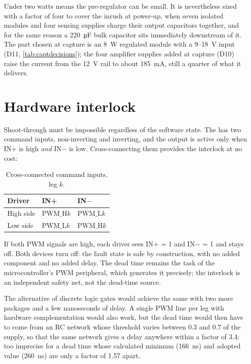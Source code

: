 Under two watts means the pre-regulator can be small. It is nevertheless
sized with a factor of four to cover the inrush at power-up, when seven
isolated modules and four sensing supplies charge their output capacitors
together, and for the same reason a \SI{220}{\micro\farad} bulk capacitor
sits immediately downstream of it. The part chosen at capture is an
\SI{8}{\watt} regulated module with a \SI{9}{}--\SI{18}{\volt}
input~\cite{traco_ten8} (D11, \cref{tab:captdecisions}); the four amplifier
supplies added at capture (D10) raise the current from the \SI{12}{\volt}
rail to about \SI{185}{\milli\ampere}, still a quarter of what it delivers.

\section{Hardware interlock}

Shoot-through must be impossible regardless of the software state. The
\driver{} has two command inputs, non-inverting and inverting, and the output
is active only when IN+ is high \emph{and} IN$-$ is low. Cross-connecting
them provides the interlock at no cost:

\begin{table}[htbp]
\centering
\caption{Cross-connected command inputs, leg $k$.}
\label{tab:interlock}
\begin{tabular}{lll}
\toprule
Driver & IN+ & IN$-$ \\
\midrule
High side & $\mathrm{PWM\_H}k$ & $\mathrm{PWM\_L}k$ \\
Low side  & $\mathrm{PWM\_L}k$ & $\mathrm{PWM\_H}k$ \\
\bottomrule
\end{tabular}
\end{table}

If both PWM signals are high, each driver sees IN+ = 1 and IN$-$ = 1 and
stays off. Both devices turn off: the fault state is safe by construction,
with no added component and no added delay. The dead time remains the task
of the microcontroller's PWM peripheral, which generates it precisely; the
interlock is an independent safety net, not the dead-time source.

The alternative of discrete logic gates would achieve the same with two more
packages and a few nanoseconds of delay. A single PWM line per leg with
hardware complementation would also work, but the dead time would then have
to come from an RC network whose threshold varies between
\num{0.3} and \num{0.7} of the supply, so that the same network gives a
delay anywhere within a factor of 3.4: too imprecise for a dead time whose
calculated minimum (\SI{166}{\nano\second}) and adopted value
(\SI{260}{\nano\second}) are only a factor of 1.57 apart.

